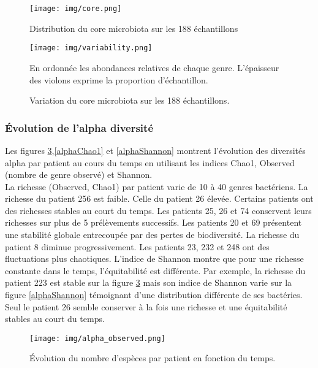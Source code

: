 \documentclass[12pt,a4paper]{article}
\begin{document}
\begin{figure}[t]
\begin{center}
\texttt{[image: img/core.png]}\hfill
\end{center}
\caption{Distribution du core microbiota sur les 188 échantillons}
\label{core}
\end{figure}

\begin{figure}
\begin{center}
\texttt{[image: img/variability.png]}\hfill
\end{center}
\caption{Variation du core microbiota sur les 188 échantillons.}
En ordonnée les abondances relatives de chaque genre. L’épaisseur des violons exprime la proportion d'échantillon.
\label{violon}
\end{figure}
\clearpage

\subsubsection{Évolution de l'alpha diversité}
Les figures \ref{alphaObs},\ref{alphaChao1} et \ref{alphaShannon} montrent l’évolution des diversités alpha par patient au cours du temps en utilisant les indices Chao1, Observed (nombre de genre observé) et Shannon. \\
La richesse (Observed, Chao1) par patient varie de 10 à 40 genres bactériens. La richesse du patient 256 est faible. Celle du patient 26 élevée.
Certains patients ont des richesses stables au court du temps. Les patients 25, 26 et 74 conservent leurs richesses sur plus de 5 prélèvements successifs. Les patients 20 et 69 présentent une stabilité globale entrecoupée par des pertes de biodiversité. La richesse du patient 8 diminue progressivement. Les patients 23, 232 et 248 ont des fluctuations plus chaotiques.
L'indice de Shannon montre que pour une richesse constante dans le temps, l'équitabilité est différente. Par exemple, la richesse du patient 223 est stable sur la figure \ref{alphaObs} mais son indice de Shannon varie sur la figure \ref{alphaShannon} témoignant d'une distribution différente de ses bactéries. Seul le patient 26 semble conserver à la fois une richesse et une équitabilité stables au court du temps.

\begin{figure}[H]
\begin{center}
\texttt{[image: img/alpha\_observed.png]}\hfill
\end{center}
\caption{Évolution du nombre d'espèces par patient en fonction du temps.}
\label{alphaObs}
\end{figure}
\end{document}
